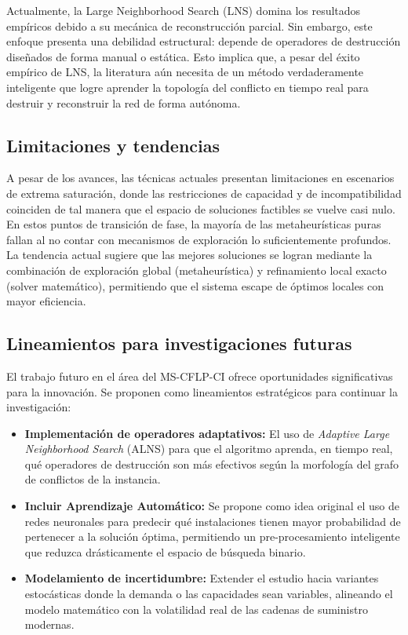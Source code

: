 \documentclass[letter, 10pt]{article}
\begin{document}
Actualmente, la Large Neighborhood Search (LNS) domina los resultados empíricos debido a su mecánica de reconstrucción parcial. Sin embargo, este enfoque presenta una debilidad estructural: depende de operadores de destrucción diseñados de forma manual o estática. Esto implica que, a pesar del éxito empírico de LNS, la literatura aún necesita de un método verdaderamente inteligente que logre aprender la topología del conflicto en tiempo real para destruir y reconstruir la red de forma autónoma.

\subsection{Limitaciones y tendencias}
A pesar de los avances, las técnicas actuales presentan limitaciones en escenarios de extrema saturación, donde las restricciones de capacidad y de incompatibilidad coinciden de tal manera que el espacio de soluciones factibles se vuelve casi nulo. En estos puntos de transición de fase, la mayoría de las metaheurísticas puras fallan al no contar con mecanismos de exploración lo suficientemente profundos. La tendencia actual sugiere que las mejores soluciones se logran mediante la combinación de exploración global (metaheurística) y refinamiento local exacto (solver matemático), permitiendo que el sistema escape de óptimos locales con mayor eficiencia.

\subsection{Lineamientos para investigaciones futuras}
El trabajo futuro en el área del MS-CFLP-CI ofrece oportunidades significativas para la innovación. Se proponen como lineamientos estratégicos para continuar la investigación:
\begin{itemize}
    \item \textbf{Implementación de operadores adaptativos:} El uso de \textit{Adaptive Large Neighborhood Search} (ALNS) para que el algoritmo aprenda, en tiempo real, qué operadores de destrucción son más efectivos según la morfología del grafo de conflictos de la instancia.
    \item \textbf{Incluir Aprendizaje Automático:} Se propone como idea original el uso de redes neuronales para predecir qué instalaciones tienen mayor probabilidad de pertenecer a la solución óptima, permitiendo un pre-procesamiento inteligente que reduzca drásticamente el espacio de búsqueda binario.
    \item \textbf{Modelamiento de incertidumbre:} Extender el estudio hacia variantes estocásticas donde la demanda o las capacidades sean variables, alineando el modelo matemático con la volatilidad real de las cadenas de suministro modernas.
\end{itemize}
\end{document}
